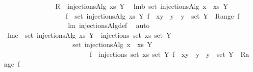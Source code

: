 \begin{isabellebody}
\ \ \ \ \ \ \ \ \ \ \ \ \ \ \ {\isachardot}R\ {\isasymleftarrow}\ injectionsAlg\ xs\ Y\ {\isacharbrackright}{\isachardoublequoteclose}\isanewline
\isanewline
{}\isamarkupfalse%
\ lm{}{}b{\isacharcolon}\ {\isachardoublequoteopen}set\ {\isacharparenleft}injectionsAlg\ {\isacharparenleft}x\ {\isacharhash}\ xs{\isacharparenright}\ Y{\isacharparenright}\ {\isacharequal}\ \isanewline
\ \ \ \ \ \ \ \ \ \ \ \ \ \ \ \ \ {\isacharparenleft}{\isasymUnion}\ f\ {\isasymin}\ set\ {\isacharparenleft}injectionsAlg\ xs\ Y{\isacharparenright}{\isachardot}\ {\isacharbraceleft}f\ {\isasymunion}\ {\isacharbraceleft}{\isacharparenleft}x{\isacharcomma}y{\isacharparenright}{\isacharbraceright}\ {\isacharbar}\ y\ {\isachardot}\ y\ {\isasymin}\ {\isacharparenleft}set\ Y{\isacharparenright}\ {\isacharminus}\ {\isacharparenleft}Range\ f{\isacharparenright}{\isacharbraceright}{\isacharparenright}{\isachardoublequoteclose}\ \isanewline
%
\isadelimproof
\ \ \ \ \ \ \ \ \ \ \ \ \ \ \ \ \ %
\endisadelimproof
%
\isatagproof
{}\isamarkupfalse%
\ lm{}{}\ injectionsAlg{\isacharunderscore}def\ \isamarkupfalse%
\ auto%
\endisatagproof
{\isafoldproof}%
%
\isadelimproof
\isanewline
%
\endisadelimproof
\isanewline
{}\isamarkupfalse%
\ lm{}{}c{\isacharcolon}\ \ {\isachardoublequoteopen}set\ {\isacharparenleft}injectionsAlg\ xs\ Y{\isacharparenright}\ {\isacharequal}\ injections\ {\isacharparenleft}set\ xs{\isacharparenright}\ {\isacharparenleft}set\ Y{\isacharparenright}{\isachardoublequoteclose}\ \isanewline
\ \ \ \ \ \ \ \ \ \ \ \ \ \ \ \ \ \ \ \ {\isachardoublequoteopen}set\ {\isacharparenleft}injectionsAlg\ {\isacharparenleft}x\ {\isacharhash}\ xs{\isacharparenright}\ Y{\isacharparenright}\ {\isacharequal}\ \isanewline
\ \ \ \ \ \ \ \ \ \ \ \ \ \ \ \ \ \ \ \ \ \ \ \ {\isacharparenleft}{\isasymUnion}\ f\ {\isasymin}\ injections\ {\isacharparenleft}set\ xs{\isacharparenright}\ {\isacharparenleft}set\ Y{\isacharparenright}{\isachardot}\ {\isacharbraceleft}f\ {\isasymunion}\ {\isacharbraceleft}{\isacharparenleft}x{\isacharcomma}y{\isacharparenright}{\isacharbraceright}\ {\isacharbar}\ y\ {\isachardot}\ y\ {\isasymin}\ {\isacharparenleft}set\ Y{\isacharparenright}\ {\isacharminus}\ {\isacharparenleft}Range\ f{\isacharparenright}{\isacharbraceright}{\isacharparenright}{\isachardoublequoteclose}\ \isanewline
%
\isadelimproof
\ \ \ \ \ \ \ \ \ \ \ \ \ \ \ \ \ %
\endisadelimproof
%
\isatagproof
{}\isamarkupfalse%

\end{isabellebody}
